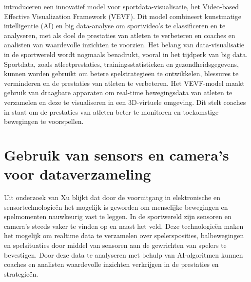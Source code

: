 \textcite{Liu2021} introduceren een innovatief model voor sportdata-visualisatie, het Video-based Effective Visualization Framework (VEVF). Dit model combineert kunstmatige intelligentie (AI) en big data-analyse om sportvideo's te classificeren en te analyseren, met als doel de prestaties van atleten te verbeteren en coaches en analisten van waardevolle inzichten te voorzien.
Het belang van data-visualisatie in de sportwereld wordt nogmaals benadrukt, vooral in het tijdperk van big data. Sportdata, zoals atleetprestaties, trainingsstatistieken en gezondheidsgegevens, kunnen worden gebruikt om betere spelstrategieën te ontwikkelen, blessures te verminderen en de prestaties van atleten te verbeteren. Het VEVF-model maakt gebruik van draagbare apparaten om real-time bewegingsdata van atleten te verzamelen en deze te visualiseren in een 3D-virtuele omgeving. Dit stelt coaches in staat om de prestaties van atleten beter te monitoren en toekomstige bewegingen te voorspellen.

\section{Gebruik van sensors en camera's voor dataverzameling}
Uit onderzoek van Xu \textcite{Sun2021} blijkt dat door de vooruitgang in elektronische en sensortechnologieën het mogelijk is geworden om menselijke bewegingen en spelmomenten nauwkeurig vast te leggen. In de sportwereld zijn sensoren en camera's steeds vaker te vinden op en naast het veld. Deze technologieën maken het mogelijk om realtime data te verzamelen over spelersposities, balbewegingen en spelsituaties door middel van sensoren aan de gewrichten van spelers te bevestigen. Door deze data te analyseren met behulp van AI-algoritmen kunnen coaches en analisten waardevolle inzichten verkrijgen in de prestaties en strategieën.

